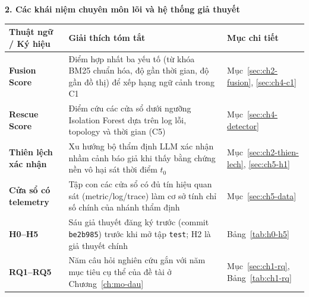 \documentclass[a4paper,table]{article}
\theoremstyle{definition}
\newcommand{\splitname}[1]{\texttt{#1}}
\newcommand{\tblfont}{\fontsize{10.5pt}{14.5pt}\selectfont}
\begin{document}
\vspace{0.3cm}
\noindent\textbf{2. Các khái niệm chuyên môn lõi và hệ thống giả thuyết}
\begin{center}
\tblfont
\renewcommand{\arraystretch}{1.25}
\begin{tabularx}{\linewidth}{|>{\raggedright\arraybackslash}p{4.0cm}|Y|>{\raggedright\arraybackslash}p{2.6cm}|}
  \hline
  \textbf{Thuật ngữ / Ký hiệu} & \textbf{Giải thích tóm tắt} & \textbf{Mục chi tiết} \\
  \hline
  \textbf{Fusion Score} & Điểm hợp nhất ba yếu tố (từ khóa BM25 chuẩn hóa, độ gần thời gian, độ gần đồ thị) để xếp hạng ngữ cảnh trong C1 & Mục~\ref{sec:ch2-fusion}, \ref{sec:ch4-c1} \\
  \hline
  \textbf{Rescue Score} & Điểm cứu các cửa sổ dưới ngưỡng Isolation Forest dựa trên log lỗi, topology và thời gian (C5) & Mục~\ref{sec:ch4-detector} \\
  \hline
  \textbf{Thiên lệch xác nhận} & Xu hướng bộ thẩm định LLM xác nhận nhầm cảnh báo giả khi thấy bằng chứng nền vô hại sát thời điểm $t_0$ & Mục~\ref{sec:ch2-thien-lech}, \ref{sec:ch5-h1} \\
  \hline
  \textbf{Cửa sổ có telemetry} & Tập con các cửa sổ có đủ tín hiệu quan sát (metric/log/trace) làm cơ sở tính chỉ số chính của nhánh thẩm định & Mục~\ref{sec:ch5-data} \\
  \hline
  \textbf{H0--H5} & Sáu giả thuyết đăng ký trước (commit \texttt{be2b985}) trước khi mở tập \splitname{test}; H2 là giả thuyết chính & Bảng~\ref{tab:h0-h5} \\
  \hline
  \textbf{RQ1--RQ5} & Năm câu hỏi nghiên cứu gắn với năm mục tiêu cụ thể của đề tài ở Chương~\ref{ch:mo-dau} & Mục~\ref{sec:ch1-rq}, Bảng~\ref{tab:ch1-rq} \\
  \hline
\end{tabularx}
\end{center}
\newpage

\cleardoublepage
{}
\listoffigures
\newpage

\cleardoublepage
{}
\listoftables
\newpage

 
 \newpage
 
 \newpage
 
 \newpage
 
 \newpage
 
 \newpage
 
 \newpage
 
 \newpage
 
 \newpage
 
 \newpage
 
\end{document}
